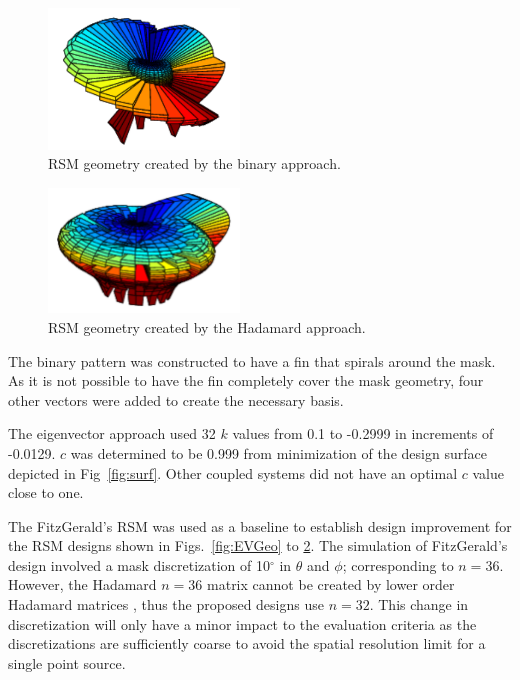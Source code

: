 \documentclass[3p,times]{elsarticle}
\begin{document}
\begin{figure}[ht!]
\includegraphics[width={2.0in}]{../figs/BiGeo.pdf}
\centering
\caption{RSM geometry created by the binary approach.}
\label{fig:BiGeo}

\end{figure}
\begin{figure}[ht!]
\centering
\includegraphics[width={2.0in}]{../figs/HadGeo.pdf}
\caption{RSM geometry created by the Hadamard approach.}
\label{fig:HadGeo}
\end{figure}

The binary pattern was constructed to have a fin that spirals around the mask.  
As it is not possible to have the fin completely cover the mask geometry, four other vectors were added to create the necessary basis.

The eigenvector approach used 32 $k$ values from 0.1 to -0.2999 in increments of -0.0129. 
$c$ was determined to be 0.999 from minimization of the design surface depicted in Fig~\ref{fig:surf}.  
Other coupled systems did not have an optimal $c$ value close to one.

The FitzGerald's RSM was used as a baseline to establish design improvement for the RSM designs shown in Figs.~\ref{fig:EVGeo} to \ref{fig:HadGeo}.  
The simulation of FitzGerald's design involved a mask discretization of 10$^\circ$ in $\theta$ and $\phi$; corresponding to $n=36$.  However, the Hadamard $n=36$ matrix cannot be created by lower order Hadamard matrices \cite{Weisstein}, thus the proposed designs use $n=32$. 
This change in discretization will only have a minor impact to the evaluation criteria as the discretizations are sufficiently coarse to avoid the spatial resolution limit for a single point source.
\end{document}
